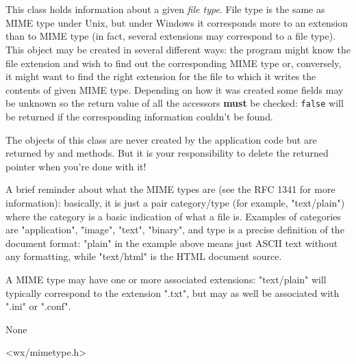 \section{}\label{wxfiletype}

This class holds information about a given {\it file type}. File type is the same as
MIME type under Unix, but under Windows it corresponds more to an extension than
to MIME type (in fact, several extensions may correspond to a file type). This
object may be created in several different ways: the program might know the file
extension and wish to find out the corresponding MIME type or, conversely, it
might want to find the right extension for the file to which it writes the
contents of given MIME type. Depending on how it was created some fields may be
unknown so the return value of all the accessors {\bf must} be checked: {\tt false}
will be returned if the corresponding information couldn't be found.

The objects of this class are never created by the application code but are
returned by  and 
 methods.
But it is your responsibility to delete the returned pointer when you're done
with it!

A brief reminder about what the MIME types are (see the RFC 1341 for more
information): basically, it is just a pair category/type (for example,
"text/plain") where the category is a basic indication of what a file is.
Examples of categories are "application", "image", "text", "binary", and
type is a precise definition of the document format: "plain" in the example
above means just ASCII text without any formatting, while "text/html" is the
HTML document source.

A MIME type may have one or more associated extensions: "text/plain" will
typically correspond to the extension ".txt", but may as well be associated with
".ini" or ".conf".


None


<wx/mimetype.h>




